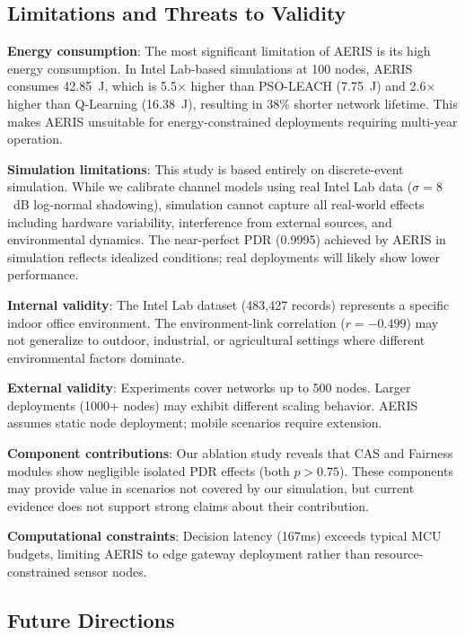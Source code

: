 \documentclass[sensors,article,submit,moreauthors,pdftex]{Definitions/mdpi}
\begin{document}
\subsection{Limitations and Threats to Validity}

\textbf{Energy consumption}: The most significant limitation of AERIS is its high energy consumption. In Intel Lab-based simulations at 100 nodes, AERIS consumes 42.85~J, which is 5.5$\times$ higher than PSO-LEACH (7.75~J) and 2.6$\times$ higher than Q-Learning (16.38~J), resulting in 38\% shorter network lifetime. This makes AERIS unsuitable for energy-constrained deployments requiring multi-year operation.

\textbf{Simulation limitations}: This study is based entirely on discrete-event simulation. While we calibrate channel models using real Intel Lab data ($\sigma = 8$~dB log-normal shadowing), simulation cannot capture all real-world effects including hardware variability, interference from external sources, and environmental dynamics. The near-perfect PDR (0.9995) achieved by AERIS in simulation reflects idealized conditions; real deployments will likely show lower performance.

\textbf{Internal validity}: The Intel Lab dataset (483,427 records) represents a specific indoor office environment. The environment-link correlation ($r = -0.499$) may not generalize to outdoor, industrial, or agricultural settings where different environmental factors dominate.

\textbf{External validity}: Experiments cover networks up to 500 nodes. Larger deployments (1000+ nodes) may exhibit different scaling behavior. AERIS assumes static node deployment; mobile scenarios require extension.

\textbf{Component contributions}: Our ablation study reveals that CAS and Fairness modules show negligible isolated PDR effects (both $p > 0.75$). These components may provide value in scenarios not covered by our simulation, but current evidence does not support strong claims about their contribution.

\textbf{Computational constraints}: Decision latency (167ms) exceeds typical MCU budgets, limiting AERIS to edge gateway deployment rather than resource-constrained sensor nodes.

\subsection{Future Directions}
\end{document}
